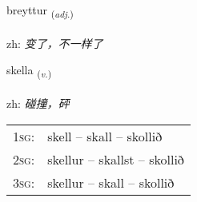 \documentclass[frontgrid, backgrid]{flacards}\usepackage[]{graphicx}\usepackage[]{color}
\begin{document}
\renewcommand{\flhead}{\vskip5pt \fboxsep=0pt {\small\bfseries\footnotesize Lýsingarorð | 形容词}}
\renewcommand{\fcfoot}{\vskip5pt \fboxsep=0pt \hspace{2pt}{\small\bfseries\footnotesize 2K}}

\renewcommand{\blhead}{\vskip5pt {\small\bfseries\footnotesize Lýsingarorð | 形容词 }}
\renewcommand{\bcfoot}{\vskip5pt \hspace{2pt}{\small\bfseries\footnotesize 2K}}


{breyttur \small{\textsubscript{(\textit{adj.})}} \\[1ex] %
\textphonetic{[preihtʏr]} \\
zh: \emph{变了，不一样了} \\  [2ex]
\renewcommand*{\arraystretch}{0.8}
}

\renewcommand{\flhead}{\vskip5pt \fboxsep=0pt {\small\bfseries\footnotesize Sagnorð | 动词}}
\renewcommand{\fcfoot}{\vskip5pt \fboxsep=0pt \hspace{2pt}{\small\bfseries\footnotesize 2K}}

\renewcommand{\blhead}{\vskip5pt {\small\bfseries\footnotesize Sagnorð | 动词 }}
\renewcommand{\bcfoot}{\vskip5pt \hspace{2pt}{\small\bfseries\footnotesize 2K}}


{skella \small{\textsubscript{(\textit{v.})}} \\[1ex] %
\textphonetic{[scɛtla]} \\
zh: \emph{碰撞，砰} \\  [2ex]
\renewcommand*{\arraystretch}{0.8}
\begin{tabular}{p{1cm}l}
\textsc{1sg}: & skell -- skall -- skollið \\ 
\textsc{2sg}: & skellur -- skallst -- skollið \\ 
\textsc{3sg}: & skellur -- skall -- skollið \\ 
\end{tabular}
}
\end{document}

